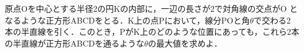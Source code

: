 \documentclass[../../main.tex]{subfiles}
\begin{document}
原点Oを中心とする半径2の円Kの内部に，一辺の長さが2で対角線の交点がO となるような正方形ABCDをとる．K上の点Pにおいて，線分POと角$\theta$で交わる2 本の半直線を引く．このとき，PがK上のどのような位置にあっても，これら2本の半直線が正方形ABCDを通るような$\theta$の最大値を求めよ．
\end{document}

